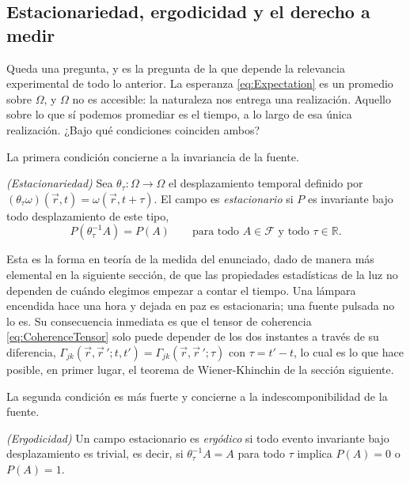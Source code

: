 	\subsection{Estacionariedad, ergodicidad y el derecho a medir}

		Queda una pregunta, y es la pregunta de la que depende la relevancia experimental de todo lo anterior. La esperanza \eqref{eq:Expectation} es un promedio sobre $\Omega$, y $\Omega$ no es accesible: la naturaleza nos entrega una realización. Aquello sobre lo que sí podemos promediar es el tiempo, a lo largo de esa única realización. ¿Bajo qué condiciones coinciden ambos?

		La primera condición concierne a la invariancia de la fuente.

		\begin{myDef}
			\textit{(Estacionariedad)} Sea $\theta_{\tau}:\Omega\to\Omega$ el desplazamiento temporal definido por $(\theta_{\tau}\omega)(\vec{r},t) = \omega(\vec{r},t+\tau)$. El campo es \textit{estacionario} si $P$ es invariante bajo todo desplazamiento de este tipo,
			\begin{equation}\label{eq:StationarityMeasure}
				P\left(\theta_{\tau}^{-1}A\right) = P(A) \qquad \text{para todo } A\in\mathcal{F} \text{ y todo } \tau\in\mathbb{R}.
			\end{equation}
		\end{myDef}

		Esta es la forma en teoría de la medida del enunciado, dado de manera más elemental en la siguiente sección, de que las propiedades estadísticas de la luz no dependen de cuándo elegimos empezar a contar el tiempo. Una lámpara encendida hace una hora y dejada en paz es estacionaria; una fuente pulsada no lo es. Su consecuencia inmediata es que el tensor de coherencia \eqref{eq:CoherenceTensor} solo puede depender de los dos instantes a través de su diferencia, $\Gamma_{jk}(\vec{r},\vec{r}\,';t,t') = \Gamma_{jk}(\vec{r},\vec{r}\,';\tau)$ con $\tau=t'-t$, lo cual es lo que hace posible, en primer lugar, el teorema de Wiener-Khinchin de la sección siguiente.

		La segunda condición es más fuerte y concierne a la indescomponibilidad de la fuente.

		\begin{myDef}
			\textit{(Ergodicidad)} Un campo estacionario es \textit{ergódico} si todo evento invariante bajo desplazamiento es trivial, es decir, si $\theta_{\tau}^{-1}A = A$ para todo $\tau$ implica $P(A)=0$ o $P(A)=1$.
		\end{myDef}

